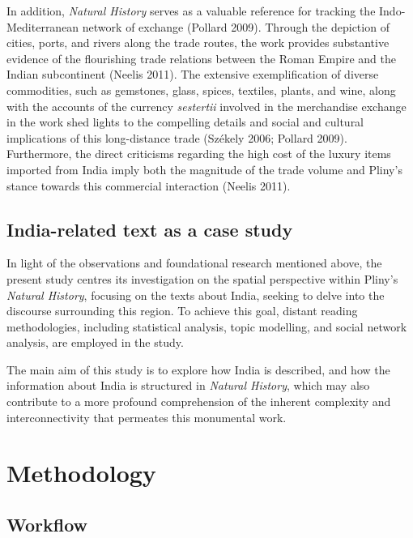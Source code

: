 \documentclass[
  12pt,
]{article}
\begin{document}
In addition, \emph{Natural History} serves as a valuable reference for
tracking the Indo-Mediterranean network of exchange (Pollard 2009).
Through the depiction of cities, ports, and rivers along the trade
routes, the work provides substantive evidence of the flourishing trade
relations between the Roman Empire and the Indian subcontinent (Neelis
2011). The extensive exemplification of diverse commodities, such as
gemstones, glass, spices, textiles, plants, and wine, along with the
accounts of the currency \emph{sestertii} involved in the merchandise
exchange in the work shed lights to the compelling details and social
and cultural implications of this long-distance trade (Székely 2006;
Pollard 2009). Furthermore, the direct criticisms regarding the high
cost of the luxury items imported from India imply both the magnitude of
the trade volume and Pliny's stance towards this commercial interaction
(Neelis 2011).

\hypertarget{india-related-text-as-a-case-study}{%
\subsection{India-related text as a case
study}\label{india-related-text-as-a-case-study}}

In light of the observations and foundational research mentioned above,
the present study centres its investigation on the spatial perspective
within Pliny's \emph{Natural History}, focusing on the texts about
India, seeking to delve into the discourse surrounding this region. To
achieve this goal, distant reading methodologies, including statistical
analysis, topic modelling, and social network analysis, are employed in
the study.

The main aim of this study is to explore how India is described, and how
the information about India is structured in \emph{Natural History},
which may also contribute to a more profound comprehension of the
inherent complexity and interconnectivity that permeates this monumental
work.

\newpage

\hypertarget{sec-methodology}{%
\section{Methodology}\label{sec-methodology}}

\hypertarget{workflow}{%
\subsection{Workflow}\label{workflow}}
\end{document}
